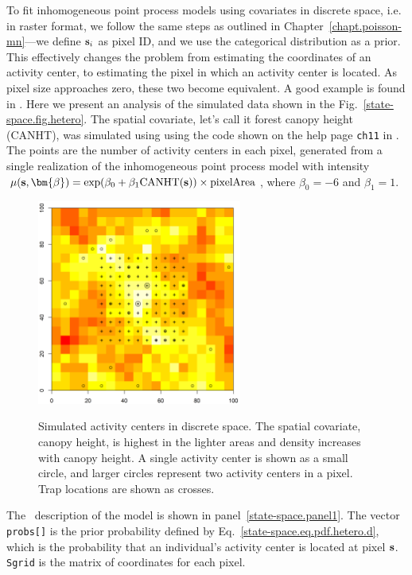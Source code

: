 To fit inhomogeneous point process models using covariates in discrete
space, i.e. in raster format, we follow the same steps
as outlined in Chapter~\ref{chapt.poisson-mn}---we define ${\bf s}_i$ as
pixel ID, and we use the categorical distribution as a prior. This
effectively changes the problem from estimating the coordinates of an
activity center, to estimating the pixel in which an activity center is
located. As pixel size approaches zero, these two become equivalent. A good
example is found in \citep{mollet_etal:2012}. Here we present
an analysis of the simulated data shown in the %
Fig.~\ref{state-space.fig.hetero}. The spatial covariate, let's call it
forest canopy height (CANHT), was simulated
using using the code shown on the help page
\verb+ch11+ in \scrbook. The points are the number of
activity centers in each pixel, generated from a single realization of
the inhomogeneous point process model with intensity
$\mu(\mathbf{s}, \bm{\beta}) = \exp(\beta_0 + \beta_1
\text{CANHT}({\bf s}))\times\text{pixelArea}$,
where $\beta_0 = -6$ and $\beta_1 = 1$.
\begin{figure}%
\centering
\includegraphics[width=0.6\textwidth]{Ch11-Statespace/figs/discrete}
\label{state-space.fig.discrete}
\caption{Simulated activity centers in discrete space. The spatial
  covariate, canopy height, is highest in the lighter areas and
  density increases with canopy height. A single
  activity center is shown as a small circle, and larger circles
  represent two activity centers in a pixel. Trap locations
  are shown as crosses.}
\end{figure}

The \bugs~description of the model is shown in
panel~\ref{state-space.panel1}. The vector \verb+probs[]+ is the prior
probability defined by Eq.~\ref{state-space.eq.pdf.hetero.d}, which is
the probability that an individual's activity center is located at
pixel $\bf s$. \verb+Sgrid+ is the matrix of coordinates for each pixel.

